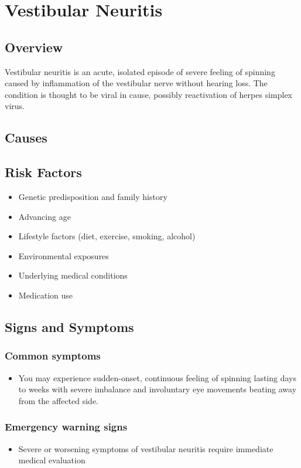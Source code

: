 \chapter{Vestibular Neuritis}
\label{sec:Vestibular Neuritis}

\section{Overview}
Vestibular neuritis is an acute, isolated episode of severe feeling of spinning caused by inflammation of the vestibular nerve without hearing loss. The condition is thought to be viral in cause, possibly reactivation of herpes simplex virus.
\section{Causes}
\section{Risk Factors}

\begin{itemize}[noitemsep]
  \item Genetic predisposition and family history
  \item Advancing age
  \item Lifestyle factors (diet, exercise, smoking, alcohol)
  \item Environmental exposures
  \item Underlying medical conditions
  \item Medication use
\end{itemize}
\section{Signs and Symptoms}

\subsection{Common symptoms}
\begin{itemize}[noitemsep]
  \item You may experience sudden-onset, continuous feeling of spinning lasting days to weeks with severe imbalance and involuntary eye movements beating away from the affected side. 
  \end{itemize}

\subsection{Emergency warning signs}
\begin{itemize}[noitemsep]
  \item Severe or worsening symptoms of vestibular neuritis require immediate medical evaluation
\end{itemize}
